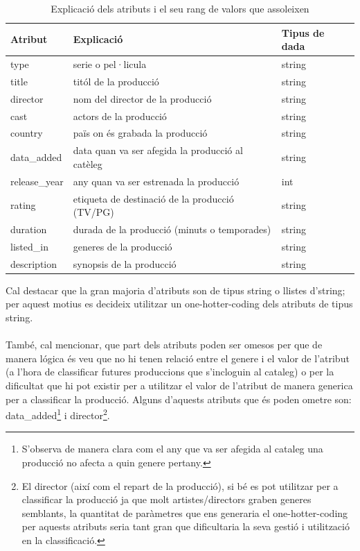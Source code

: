 \documentclass[a4paper, 11pt]{article}
\begin{document}
\begin{table}[h!]
    \centering
    \begin{tabular}{l|l|l}
        \textbf{Atribut} & \textbf{Explicació} & \textbf{Tipus de dada}\\\hline\hline
        type & serie o pel·licula & string\\\hline 
        title & titól de la producció & string\\\hline
        director & nom del director de la producció & string \\\hline
        cast & actors de la producció &  string \\\hline
        country & païs on és grabada la producció & string \\\hline
        data\_added & data quan va ser afegida la producció al catèleg & string\\\hline
        release\_year & any quan va ser estrenada la producció & int  \\\hline
        rating & etiqueta de destinació de la producció (TV/PG) & string \\\hline
        duration & durada de la producció (minuts o temporades) & string \\\hline
        listed\_in & generes de la producció & string \\\hline
        description & synopsis de la producció & string
    \end{tabular}
    \caption{Explicació dels atributs i el seu rang de valors que assoleixen}
    \label{explicació_atributs}
\end{table}
\hspace{-2.1 em}
Cal destacar que la gran majoria d'atributs son de tipus string o llistes d'string; per aquest motius es decideix utilitzar un one-hotter-coding dels atributs de tipus string.\\\\
També, cal mencionar, que part dels atributs poden ser omesos per que de manera lógica és veu que no hi tenen relació entre el genere i el valor de l'atribut (a l'hora de classificar futures produccions que s'incloguin al cataleg) o per la dificultat que hi pot existir per a utilitzar el valor de l'atribut de manera generica per a classificar la producció. Alguns d'aquests atributs que és poden ometre son:
data\_added\footnote{S'observa de manera clara com el any que va ser afegida al cataleg una producció no afecta a quin genere pertany.} i director\footnote{El director (així com el repart de la producció), si bé es pot utilitzar per a classificar la producció ja que molt artistes/directors graben generes semblants, la quantitat de paràmetres que ens generaria el one-hotter-coding per aquests atributs seria tant gran que dificultaria la seva gestió i utilització en la classificació.}. 
\newpage
\end{document}
